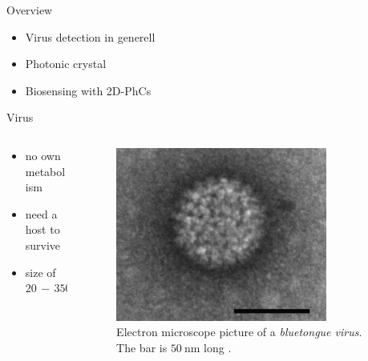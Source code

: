 


\frame{\maketitle}


\begin{frame}{Overview}
\begin{itemize}
  \setlength\itemsep{1.2em}
  \item{Virus detection in generell}
  \item{Photonic crystal}
  \item{Biosensing with 2D-PhCs}
\end{itemize}

\end{frame}

\begin{frame}{Virus}
  \begin{columns}

  \begin{column}{0.49\textwidth}
    \begin{itemize}
      \setlength\itemsep{1.2em}
      \item{no own metabolism}
      \item{need a host to survive} %
      \item{size of $\num{20}\,-\, \num{350}\,\si{\nano\meter}$}
    \end{itemize}
  \end{column}

  \begin{column}{0.49\textwidth}
    \begin{figure}
      \centering
      \includegraphics[width=0.8\textwidth]{./bilder/virus.png}
      \caption{Electron microscope picture of a \emph{bluetongue virus}. The bar is $\SI{50}{\nano\meter}$ long \cite{virus}.}
      \label{fig: 2d_photonic_crystal}
    \end{figure}
  \end{column}

  \end{columns}
\end{frame}

